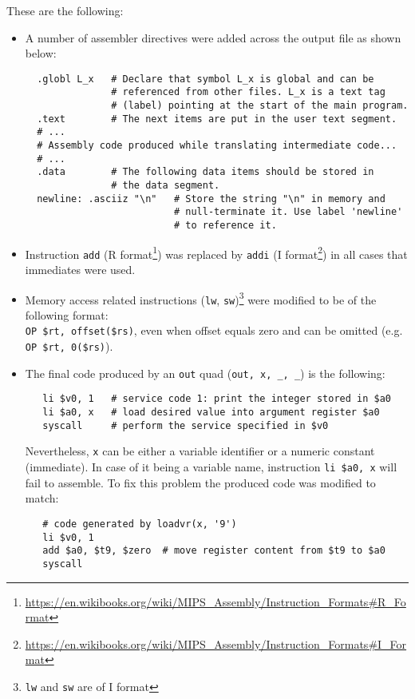 \documentclass{article}
\def\code#1{\texttt{#1}} %
\begin{document}
These are the following:
\begin{itemize}
 \item A number of assembler directives were added across the output file as shown below:
  \begin{lstlisting}
  .globl L_x   # Declare that symbol L_x is global and can be
               # referenced from other files. L_x is a text tag
               # (label) pointing at the start of the main program.
  .text        # The next items are put in the user text segment.
  # ...
  # Assembly code produced while translating intermediate code...
  # ...
  .data        # The following data items should be stored in
               # the data segment.
  newline: .asciiz "\n"   # Store the string "\n" in memory and
                          # null-terminate it. Use label 'newline'
                          # to reference it.
  \end{lstlisting}
  \newpage
 \item Instruction \code{add} (R format\footnote{\url{https://en.wikibooks.org/wiki/MIPS_Assembly/Instruction_Formats\#R_Format}})
       was replaced by \code{addi} (I format\footnote{\url{https://en.wikibooks.org/wiki/MIPS_Assembly/Instruction_Formats\#I_Format}})
       in all cases that immediates were used.
 \item Memory access related instructions (\code{lw}, \code{sw})\footnote{\code{lw} and \code{sw} are of I format}
       were modified to be of the following format:\\ \verb|OP $rt, offset($rs)|, even when offset equals zero
       and can be omitted (e.g. \verb|OP $rt, 0($rs)|).
 \item The final code produced by an \code{out} quad (\verb|out, x, _, _|) is the following:
   \begin{lstlisting}
   li $v0, 1   # service code 1: print the integer stored in $a0
   li $a0, x   # load desired value into argument register $a0
   syscall     # perform the service specified in $v0
  \end{lstlisting}
       Nevertheless, \code{x} can be either a variable identifier or a numeric constant (immediate).
       In case of it being a variable name, instruction \code{li \$a0, x} will fail to assemble.
       To fix this problem the produced code was modified to match:
  \begin{lstlisting}
   # code generated by loadvr(x, '9')
   li $v0, 1
   add $a0, $t9, $zero  # move register content from $t9 to $a0
   syscall
  \end{lstlisting}

\end{itemize}
\end{document}
